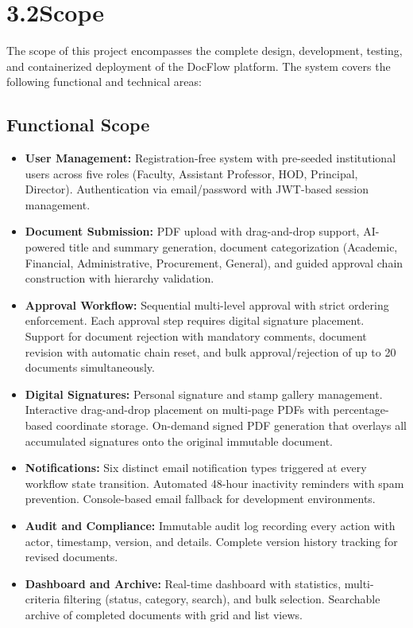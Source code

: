 \documentclass[12pt,a4paper]{report}
\begin{document}
\section*{3.2\quad Scope}

The scope of this project encompasses the complete design, development, testing, and containerized deployment of the DocFlow platform. The system covers the following functional and technical areas:

\subsection*{Functional Scope}

\begin{itemize}
    \item \textbf{User Management:} Registration-free system with pre-seeded institutional users across five roles (Faculty, Assistant Professor, HOD, Principal, Director). Authentication via email/password with JWT-based session management.

    \item \textbf{Document Submission:} PDF upload with drag-and-drop support, AI-powered title and summary generation, document categorization (Academic, Financial, Administrative, Procurement, General), and guided approval chain construction with hierarchy validation.

    \item \textbf{Approval Workflow:} Sequential multi-level approval with strict ordering enforcement. Each approval step requires digital signature placement. Support for document rejection with mandatory comments, document revision with automatic chain reset, and bulk approval/rejection of up to 20 documents simultaneously.

    \item \textbf{Digital Signatures:} Personal signature and stamp gallery management. Interactive drag-and-drop placement on multi-page PDFs with percentage-based coordinate storage. On-demand signed PDF generation that overlays all accumulated signatures onto the original immutable document.

    \item \textbf{Notifications:} Six distinct email notification types triggered at every workflow state transition. Automated 48-hour inactivity reminders with spam prevention. Console-based email fallback for development environments.

    \item \textbf{Audit and Compliance:} Immutable audit log recording every action with actor, timestamp, version, and details. Complete version history tracking for revised documents.

    \item \textbf{Dashboard and Archive:} Real-time dashboard with statistics, multi-criteria filtering (status, category, search), and bulk selection. Searchable archive of completed documents with grid and list views.
\end{itemize}
\end{document}
